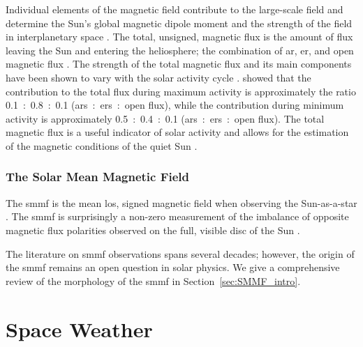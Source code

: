 Individual elements of the magnetic field contribute to the large-scale field and determine the Sun's global magnetic dipole moment and the strength of the field in interplanetary space  \citep{lockwood_doubling_1999, solanki_evolution_2000}. The total, unsigned, magnetic flux is the amount of flux leaving the Sun and entering the heliosphere; the combination of \gls{ar}, \gls{er}, and open magnetic flux \citep{lockwood_doubling_1999}. The strength of the total magnetic flux and its main components have been shown to vary with the solar activity cycle \citep{solanki_secular_2002, vieira_evolution_2010, chaplin_sensitivity_2019}. \citet{vieira_evolution_2010} showed that the contribution to the total flux during maximum activity is approximately the ratio 0.1~:~0.8~:~0.1 (\glspl{ar}~:~\glspl{er}~:~open flux), while the contribution during minimum activity is approximately 0.5~:~0.4~:~0.1 (\glspl{ar}~:~\glspl{er}~:~open flux). The total magnetic flux is a useful indicator of solar activity and allows for the estimation of the magnetic conditions of the quiet Sun \citep{vieira_evolution_2010, chaplin_sensitivity_2019}.



\subsubsection*{The Solar Mean Magnetic Field}

The \gls{smmf} is the mean \gls{los}, signed magnetic field when observing the Sun-as-a-star \citep{scherrer_mean_1977, scherrer_mean_1977-1, garcia_integrated_1999}. The \gls{smmf} is surprisingly a non-zero measurement of the imbalance of opposite magnetic flux polarities observed on the full, visible disc of the Sun \citep{svalgaard_suns_1975}.

The literature on \gls{smmf} observations spans several decades; however, the origin of the \gls{smmf} remains an open question in solar physics. We give a comprehensive review of the morphology of the \gls{smmf} in Section~\ref{sec:SMMF_intro}.





\section{Space Weather}\label{sec:intro_SW}

